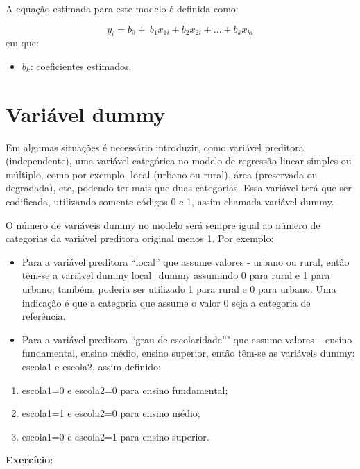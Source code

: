 \documentclass[12pt,brazil,oneside]{book}
\providecommand{\tightlist}{%
  \setlength{\itemsep}{0pt}\setlength{\parskip}{0pt}}
\begin{document}
A equação estimada para este modelo é definida como:

\[ 
y_{i} = b_0+\ b_1x_{1i}+b_2x_{2i}+\dots+b_kx_{ki} 
\] em que:

\begin{itemize}
\tightlist
\item
  \(b_k\): coeficientes estimados.
\end{itemize}

\hypertarget{variavel-dummy}{%
\section{Variável dummy}\label{variavel-dummy}}

Em algumas situações é necessário introduzir, como variável preditora
(independente), uma variável categórica no modelo de regressão linear
simples ou múltiplo, como por exemplo, local (urbano ou rural), área
(preservada ou degradada), etc, podendo ter mais que duas categorias.
Essa variável terá que ser codificada, utilizando somente códigos 0 e 1,
assim chamada variável dummy.

O número de variáveis dummy no modelo será sempre igual ao número de
categorias da variável preditora original menos 1. Por exemplo:

\begin{itemize}
\item
  Para a variável preditora ``local'' que assume valores - urbano ou
  rural, então têm-se a variável dummy local\_dummy assumindo 0 para
  rural e 1 para urbano; também, poderia ser utilizado 1 para rural e 0
  para urbano. Uma indicação é que a categoria que assume o valor 0 seja
  a categoria de referência.
\item
  Para a variável preditora ``grau de escolaridade''" que assume valores
  -- ensino fundamental, ensino médio, ensino superior, então têm-se as
  variáveis dummy: escola1 e escola2, assim definido:
\end{itemize}

\begin{enumerate}
\def\labelenumi{\alph{enumi}.}
\tightlist
\item
  escola1=0 e escola2=0 para ensino fundamental;
\item
  escola1=1 e escola2=0 para ensino médio;
\item
  escola1=0 e escola2=1 para ensino superior.
\end{enumerate}

\textbf{Exercício}:
\end{document}
